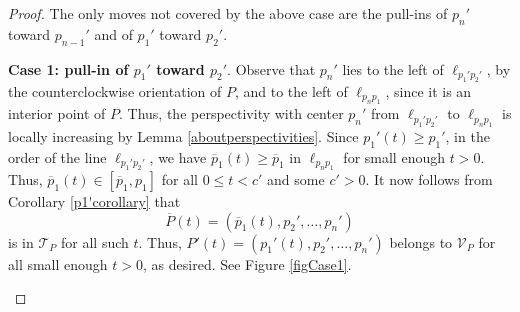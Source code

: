 \documentclass[11pt]{amsart}
\theoremstyle{remark}
\numberwithin{equation}{section}
\newcommand{\TT}{\mathcal{T}}
\newcommand{\V}{\mathcal{V}}
\renewcommand{\leq}{\leqslant}
\renewcommand{\geq}{\geqslant}
\begin{document}
\begin{proof}
The only moves not covered by the above case are the pull-ins of $p_n'$ toward $p_{n-1}'$ and of $p_1'$ toward $p_2'$.

\textbf{Case 1: pull-in of $p_1'$ toward $p_2'$}.  Observe that $p_n'$ lies to the left of $\ell_{p_1'p_2'}$, by the counterclockwise orientation of $P$, and to the left of $\ell_{p_np_1}$, since it is an interior point of $P$. Thus, the perspectivity with center $p_n'$ from $\ell_{p_1'p_2'}$ to $\ell_{p_np_1}$ is locally increasing by Lemma \ref{aboutperspectivities}. Since $p_1'(t)\geq p_1'$, in the order of the line $\ell_{p_1'p_2'}$, we have   $\overline p_1(t)\geq \overline p_1$ in   $\ell_{p_np_1}$ for small enough $t>0$. Thus, $\overline p_1(t)\in [\overline p_1,p_1]$ for all $0\leq t < c'$ and some $c'>0$. It now follows from Corollary \ref{p1'corollary} that 
\[
\overline P(t)=(\overline p_1(t),p_2',\ldots,p_n')
\] 
is in $\TT_P$ for all such $t$. Thus,  $P'(t)=(p_1'(t),p_2',\ldots,p_n')$ belongs to $\V_P$ for all small enough  $t>0$, as desired. See Figure \ref{figCase1}.



\begin{figure}[h]
\centering

\end{figure}
\end{proof}
\end{document}
